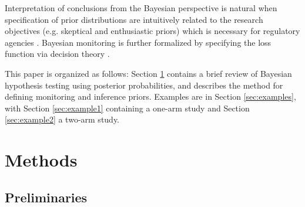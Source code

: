 \documentclass[12pt]{article}
\begin{document}
Interpretation of conclusions from the Bayesian perspective is natural when specification of prior distributions are intuitively related to the research objectives (e.g. skeptical and enthusiastic priors)  \citep{Freedman1989,Freedman1992,Spiegelhalter1993,Fayers1997} which is necessary for regulatory agencies \citep{Parmar1993}. Bayesian monitoring is further formalized by specifying the loss function via decision theory \citep{Carlin1998}.

This paper is organized as follows: Section \ref{sec:methods} contains a brief review of Bayesian hypothesis testing using posterior probabilities, and describes the method for defining monitoring and inference priors. Examples are in Section \ref{sec:examples}, with Section \ref{sec:example1} containing a one-arm study and Section \ref{sec:example2} a two-arm study.

\section{Methods}\label{sec:methods}

\subsection{Preliminaries}\label{sec:preliminaries}
\end{document}
